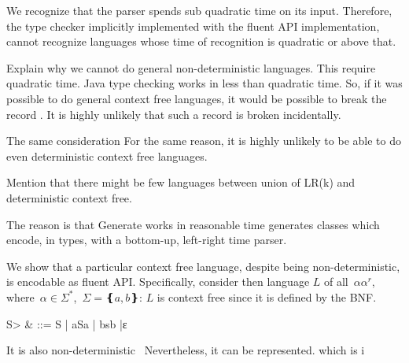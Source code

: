 We recognize that the \Java parser spends sub quadratic time 
  on its input.
Therefore, 
  the type checker implicitly implemented with the fluent API implementation, 
  cannot recognize languages whose time of recognition is quadratic or above that. 

Explain why we cannot do general non-deterministic languages. This require quadratic time.
Java type checking works in less than quadratic time. So, if it was possible to 
do general context free languages, it would be possible to break the record 
  \cite{cubic time algorithms}.
It is highly unlikely that such a record is broken incidentally.

The same consideration
For the same reason, it is highly unlikely to be able to do even deterministic context free languages.
   \cite{http://www.sciencedirect.com/science/article/pii/S0019995868910875}

   Mention that there might be few languages between union of LR(k) and deterministic context free.

The reason is that Generate works in reasonable time  \Self generates classes which encode, in types, with a bottom-up, left-right time parser.

We show that a particular context free language,
  despite being non-deterministic,  is encodable as fluent API. 
Specifically, consider then language $L$ of all~$αα^r$, where~$α∈Σ^*$,~$Σ=❴a,b❵$:
$L$ is context free since it is defined by the BNF. 
\begin{Grammar}
  \<S> & ::= S | aSa | bsb |ε
\end{Grammar}
It is also non-deterministic~\cite{Tomer:again:start:tracing:from:wikipedia:until:you:find:the excact} 
Nevertheless, it can be represented.  
which is
  i
